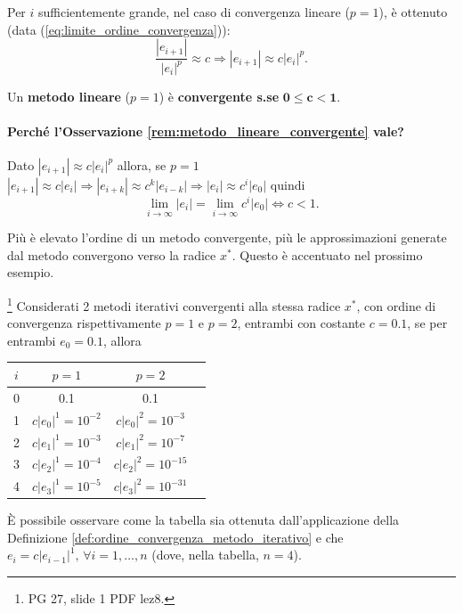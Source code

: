 \begin{remark}\label{rem:limite_ordine_convergenza}
	Per $i$ sufficientemente grande, nel caso di convergenza lineare ($p=1$), è ottenuto (data (\ref{eq:limite_ordine_convergenza})):
	\begin{equation*}
		\frac{|e_{i+1}|}{|e_i|^p}\approx c \Rightarrow |e_{i+1}|\approx c|e_i|^p.
	\end{equation*}
\end{remark}

\begin{remark}\label{rem:metodo_lineare_convergente}
	Un \textbf{\gls{metodo lineare}} ($p=1$) è \textbf{convergente s.se} $\boldsymbol{0\leq c<1}$.
\end{remark}

\paragraph{Perché l'Osservazione \ref{rem:metodo_lineare_convergente} vale?} Dato $|e_{i+1}|\approx c|e_i|^p$ allora, se $p=1$ $|e_{i+1}|\approx c|e_i|\Rightarrow |e_{i+k}|\approx c^k|e_{i-k}|\Rightarrow |e_i|\approx c^i|e_0|$ quindi
\begin{equation*}
	\underset{i\to\infty}{\lim}|e_i|=\underset{i\to\infty}{\lim}{c^i|e_0|}\iff c<1.
\end{equation*}

Più è elevato l'ordine di un metodo convergente, più le approssimazioni generate dal metodo convergono verso la radice $x^*$. Questo è accentuato nel prossimo esempio.

\begin{example}
	\footnote{PG 27, slide 1 PDF lez8.} Considerati 2 metodi iterativi convergenti alla stessa radice $x^*$, con ordine di convergenza rispettivamente $p=1$ e $p=2$, entrambi con costante $c=0.1$, se per entrambi $e_0=0.1$, allora
	\begin{center}
		\begin{tabular}{ |c|c|c|c| } 
			\hline
			$i$ & $p=1$ & $p=2$ \\
			\hline
			0 & 0.1 & 0.1 \\ 
			1 & $c|e_0|^1=10^{-2}$ & $c|e_0|^2=10^{-3}$ \\ 
			2 & $c|e_1|^1=10^{-3}$ & $c|e_1|^2=10^{-7}$\\
			3 & $c|e_2|^1=10^{-4}$ & $c|e_2|^2=10^{-15}$\\
			4 & $c|e_3|^1=10^{-5}$ & $c|e_3|^2=10^{-31}$\\
			\hline
		\end{tabular}
	\end{center}
	
	È possibile osservare come la tabella sia ottenuta dall'applicazione della Definizione \ref{def:ordine_convergenza_metodo_iterativo} e che $e_i=c|e_{i-1}|^1,\, \forall i=1,\hdots , n$ (dove, nella tabella, $n=4$).
\end{example}

